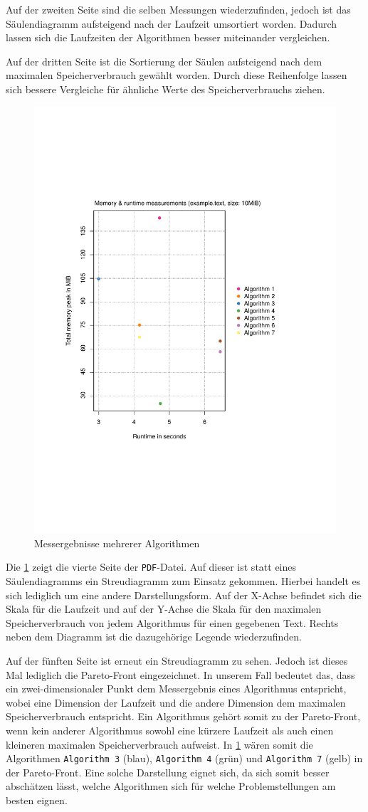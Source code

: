 Auf der zweiten Seite sind die selben Messungen wiederzufinden, jedoch ist das Säulendiagramm aufsteigend nach der Laufzeit umsortiert worden. Dadurch lassen sich die Laufzeiten der Algorithmen besser miteinander vergleichen.

Auf der dritten Seite ist die Sortierung der Säulen aufsteigend nach dem maximalen Spei\-cher\-ver\-brauch gewählt worden. Durch diese Reihenfolge lassen sich bessere Vergleiche für ähnliche Werte des Spei\-cher\-ver\-brauchs ziehen.

\begin{figure}
	\includegraphics[page = 1, width=.5\textwidth]{kapitel/3_framework/benchmark/sacabench-batch/beispiel_batch_streu.pdf}
	\caption{Messergebnisse mehrerer Algorithmen}
	\label{pdf:benchmark:batch:streu}
\end{figure}

Die \cref{pdf:benchmark:batch:streu} zeigt die vierte Seite der \texttt{PDF}-Datei. Auf dieser ist statt eines Säulendiagramms ein Streudiagramm zum Einsatz gekommen. Hierbei handelt  es sich lediglich um eine andere Darstellungsform. Auf der X-Achse befindet sich die Skala für die Laufzeit und auf der Y-Achse die Skala für den maximalen Spei\-cher\-ver\-brauch von jedem Algorithmus für einen gegebenen Text. Rechts neben dem Diagramm ist die dazugehörige Legende wiederzufinden.

Auf der fünften Seite ist erneut ein Streudiagramm zu sehen. Jedoch ist dieses Mal lediglich die Pareto-Front eingezeichnet. In unserem Fall bedeutet das, dass ein zwei-dimensionaler Punkt dem Messergebnis eines Algorithmus entspricht, wobei eine Dimension der Laufzeit und die andere Dimension dem maximalen Spei\-cher\-ver\-brauch entspricht. Ein Algorithmus gehört somit zu der Pareto-Front, wenn kein anderer Algorithmus sowohl eine kürzere Laufzeit als auch einen kleineren maximalen Spei\-cher\-ver\-brauch aufweist. In \cref{pdf:benchmark:batch:streu} wären somit die Algorithmen \texttt{Algorithm 3} (blau), \texttt{Algorithm 4} (grün) und \texttt{Algorithm 7} (gelb) in der Pareto-Front.
Eine solche Darstellung eignet sich, da sich somit besser abschätzen lässt, welche Algorithmen sich für welche Problemstellungen am besten eignen.

